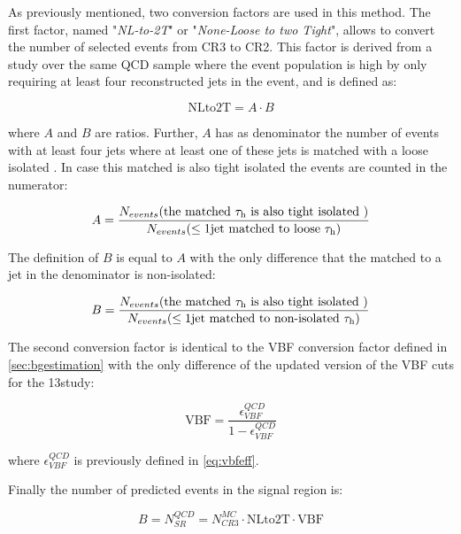 As previously mentioned, two conversion factors are used in this method. The first factor, named "\textit{NL-to-2T}" or "\textit{None-Loose to two Tight}", allows to convert the number of selected events from CR3 to CR2. This factor is derived from a study over the same QCD sample where the event population is high by only requiring at least four reconstructed jets in the event, and is defined as:

\begin{equation}
\text{NLto2T} = A \cdot B
\end{equation}

where $A$ and $B$ are ratios. Further, $A$ has as denominator the number of events with at least four jets where at least one of these jets is matched with a loose isolated \hadtau. In case this matched \hadtau is also tight isolated the events are counted in the numerator:

\begin{equation}
A = \dfrac{N_{events}(\text{the matched }\tau_{\text{h}}\text{ is also tight isolated })}{N_{events}(\leq 1\text{jet matched to loose }\tau_{\text{h}})}
\end{equation}

The definition of $B$ is equal to $A$ with the only difference that the \hadtau matched to a jet in the denominator is non-isolated:

\begin{equation}
B = \dfrac{N_{events}(\text{the matched }\tau_{\text{h}}\text{ is also tight isolated })}{N_{events}(\leq 1\text{jet matched to non-isolated }\tau_{\text{h}})}
\end{equation}

The second conversion factor is identical to the VBF conversion factor defined in \autoref{sec:bgestimation} with the only difference of the updated version of the VBF cuts for the 13\tev study:

\begin{equation}
\text{VBF} = \frac{\epsilon^{QCD}_{VBF}}{1 - \epsilon^{QCD}_{VBF}}
\end{equation}

where $\epsilon^{QCD}_{VBF}$ is previously defined in \autoref{eq:vbfeff}. 

Finally the number of predicted events in the signal region is:

\begin{equation}
B = N^{QCD}_{SR} = N^{MC}_{CR3}  \cdot \text{NLto2T} \cdot \text{VBF}
\label{eq::qcdbgpred_13tev}
\end{equation}

